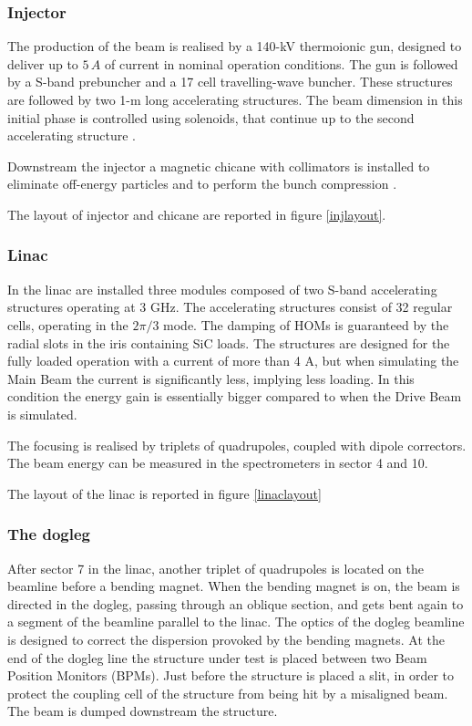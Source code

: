 \subsubsection{Injector}

The production of the beam is realised by a 140-kV thermoionic gun, designed to deliver up to $5\,A$ of current in nominal operation conditions.
The gun is followed by a S-band prebuncher and a 17 cell travelling-wave buncher. These structures are followed by two 1-m long accelerating structures. The beam dimension in this initial phase is controlled using solenoids, that continue up to the second accelerating structure \cite{ctf:injector}.

Downstream the injector a magnetic chicane with collimators is installed to eliminate off-energy particles and to perform the bunch compression  \cite{Braun:999488}.

The layout of injector and chicane are reported in figure \ref{injlayout}.

\subsubsection{Linac}

In the linac are installed three modules composed of two S-band accelerating structures operating at 3 GHz. The accelerating structures consist of 32 regular cells, operating in the $2\pi/3$ mode. The damping of HOMs is guaranteed by the radial slots in the iris containing SiC loads. The structures are designed for the fully loaded operation with a current of more than 4 A, but when simulating the Main Beam the current is significantly less, implying less loading. In this condition the energy gain is essentially bigger compared to when the Drive Beam is simulated.

The focusing is realised by triplets of quadrupoles, coupled with dipole correctors. The beam energy can be measured in the spectrometers in sector 4 and 10.

The layout of the linac is reported in figure \ref{linaclayout}

\subsubsection{The dogleg}

After sector 7 in the linac, another triplet of quadrupoles is located on the beamline before a bending magnet. When the bending magnet is on, the beam is directed in the dogleg, passing through an oblique section, and gets bent again to a segment of the beamline parallel to the linac. The optics of the dogleg beamline is designed to correct the dispersion provoked by the bending magnets. At the end of the dogleg line the structure under test is placed between two Beam Position Monitors (BPMs). Just before the structure is placed a slit, in order to protect the coupling cell of the structure from being hit by a misaligned beam. The beam is dumped downstream the structure.

